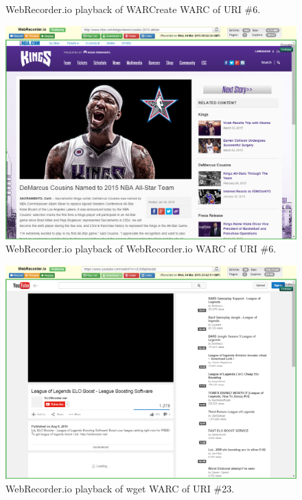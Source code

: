 \documentclass[a4paper,12pt]{article}
\begin{document}
\begin{appendices}
\begin{figure}[H]
    \caption{WebRecorder.io playback of WARCreate WARC of URI \#6.}
\end{figure}
\begin{figure}[H]
    \centering
    \includegraphics[scale=0.5]{images/6_webrecorder_in_webrecorder.png}
    \caption{WebRecorder.io playback of WebRecorder.io WARC of URI \#6.}
\end{figure}
\begin{figure}[H]
    \centering
    \includegraphics[scale=0.5]{images/23_wget_in_webrecorder.png}
    \caption{WebRecorder.io playback of wget WARC of URI \#23.}
\end{figure}
\begin{figure}[H]
    \centering

\end{figure}
\end{appendices}
\end{document}
